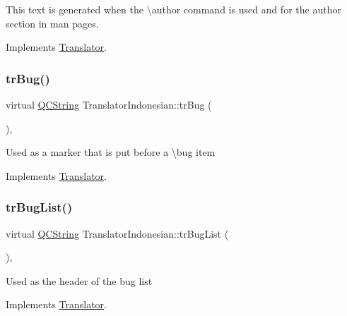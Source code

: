 This text is generated when the \textbackslash{}author command is used and for the author section in man pages. 

Implements \mbox{\hyperlink{class_translator}{Translator}}.

\mbox{\label{class_translator_indonesian_a5f3f1d4d362ea9890347e3dbc9c3372f}} 
\subsubsection{\texorpdfstring{trBug()}{trBug()}}
{\footnotesize\ttfamily virtual \mbox{\hyperlink{class_q_c_string}{Q\+C\+String}} Translator\+Indonesian\+::tr\+Bug (\begin{DoxyParamCaption}{ }\end{DoxyParamCaption})\hspace{0.3cm}{\ttfamily [inline]}, {\ttfamily [virtual]}}

Used as a marker that is put before a \textbackslash{}bug item 

Implements \mbox{\hyperlink{class_translator}{Translator}}.

\mbox{\label{class_translator_indonesian_ae9e345697076f105f1dc28b640824b54}} 
\subsubsection{\texorpdfstring{trBugList()}{trBugList()}}
{\footnotesize\ttfamily virtual \mbox{\hyperlink{class_q_c_string}{Q\+C\+String}} Translator\+Indonesian\+::tr\+Bug\+List (\begin{DoxyParamCaption}{ }\end{DoxyParamCaption})\hspace{0.3cm}{\ttfamily [inline]}, {\ttfamily [virtual]}}

Used as the header of the bug list 

Implements \mbox{\hyperlink{class_translator}{Translator}}.

\mbox{\label{class_translator_indonesian_a4b47ece1d7a23c18d7cc1fd9d44d07b5}} 
